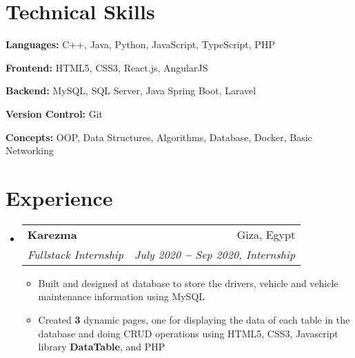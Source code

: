 \documentclass[a4paper,12pt]{article}
\makeatletter
\newcommand{\resumeItem}[1]{
  \item\small{
    {#1 \vspace{-2pt}}
  }
}
\newcommand{\resumeSubheading}[4]{
  \vspace{-2pt}\item
    \begin{tabular*}{0.97\textwidth}[t]{l@{\extracolsep{\fill}}r}
      \textbf{#1} & #2 \\
      \textit{\small#3} & \textit{\small #4} \\
    \end{tabular*}\vspace{-7pt}
}
\newcommand{\resumeSubHeadingListStart}{\begin{itemize}[leftmargin=0.15in, label={}]}
\newcommand{\resumeSubHeadingListEnd}{\end{itemize}}
\newcommand{\resumeItemListStart}{\begin{itemize}}
\newcommand{\resumeItemListEnd}{\end{itemize}\vspace{-5pt}}
\makeatother
\begin{document}
\section{Technical Skills}
  \vspace{2pt}
  \resumeSubHeadingListStart
    \small{\item{
        
        \textbf{Languages:}{ C++, Java, Python, JavaScript, TypeScript, PHP} \\ \vspace{3pt}
        
        \textbf{Frontend:}{ HTML5, CSS3, React.js, AngularJS} \\ 
        \vspace{3pt}

		\textbf{Backend:}{ MySQL, SQL Server, Java Spring Boot, Laravel} \\ 
		\vspace{3pt}   
		
		\textbf{Version Control:}{ Git} \\ 
		\vspace{3pt}   
				    
        \textbf{Concepts:}{ OOP, Data Structures, Algorithms, Database, Docker, Basic Networking} \\ 
        \vspace{3pt}
        
    }}
  \resumeSubHeadingListEnd




\section{Experience}
  \vspace{3pt}
  \resumeSubHeadingListStart


    \resumeSubheading
      {Karezma}{Giza, Egypt}
      {Fullstack Internship}{July 2020 \textbf{--} Sep 2020, Internship}
        \resumeItemListStart
        	\resumeItem{Built and designed at database to store the drivers, vehicle and vehicle maintenance information using MySQL}
        	\resumeItem{Created \textbf{3} dynamic pages, one for displaying the data of each table in the database and doing CRUD operations using HTML5, CSS3, Javascript library \textbf{DataTable}, and PHP}
        \resumeItemListEnd
  
  \resumeSubHeadingListEnd
\end{document}
